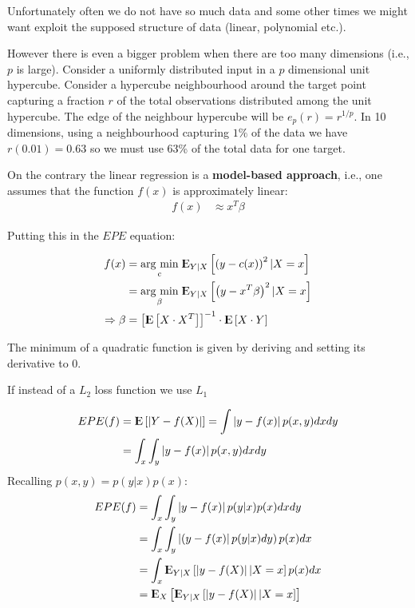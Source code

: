\documentclass[12pt, letterpaper]{article}
\theoremstyle{definition}
\newcommand{\E}{{\rm I\kern-.3em E}}
\newcommand{\argmin}[1]{\underset{#1}{\operatorname{arg}\,\operatorname{min}}\;}
\begin{document}
Unfortunately often we do not have so much data and some other times we might want exploit the supposed structure of data (linear, polynomial etc.).

However there is even a bigger problem when there are too many dimensions (i.e., $p$ is large). Consider a uniformly distributed input in a $p$ dimensional unit hypercube. Consider a hypercube neighbourhood around the target point capturing a fraction $r$ of the total observations distributed among the unit hypercube. The edge of the neighbour hypercube will be $e_p(r) = r^{1/p}$. In 10 dimensions, using a neighbourhood capturing $1\%$ of the data we have $r(0.01) = 0.63$ so we must use 63\% of the total data for one target.

On the contrary the linear regression is a \textbf{model-based approach}, i.e., one assumes that the function $f(x)$ is approximately linear:
\begin{align}
f(x) &\approx x^T \beta
\end{align}

Putting this in the $EPE$ equation:

\begin{equation}
\begin{aligned}
f(x) &= \argmin{c} \E_{Y|X} \left[ \left( y - c(x) \right)^2 | X=x \right]  \\
&= \argmin{\beta} \E_{Y|X} \left[ \left( y - x^T \beta \right)^2 | X=x \right] \\
\Rightarrow \beta &= \left[ \E\left[ X\cdot X ^T\right]\right]^{-1} \cdot \E\left[ X\cdot Y \right]
\end{aligned}
\end{equation}

The minimum of a quadratic function is given by deriving and setting its derivative to $0$.

If instead of a $L_2$ loss function we use $L_1$

\begin{equation}
\begin{aligned}
EPE(f) &= \E\left[ \left| Y- f(X) \right| \right] = \int \left| y- f(x) \right| p(x,y) dx dy \\
&= \int_x\int_y \left| y- f(x) \right|p(x,y) dx dy \\
\end{aligned}
\end{equation}
Recalling $p(x,y) = p( y|x) p(x)$:
\begin{equation}
\begin{aligned}
EPE(f) &= \int_x\int_y \left| y- f(x) \right|p(y|x)  p(x) dx dy \\
 &= \int_x \int_y \left| \left( y - f(x) \right| p(y|x) dy\right)  p(x) dx   \\
 &= \int_x \E_{Y|X} \left[ \left| y - f(X) \right| | X=x \right]  p(x) dx   \\
 &= \E_X \left[ \E_{Y|X} \left[ \left| y - f(X) \right| | X=x \right]    \right]   
\end{aligned}
\end{equation}
\end{document}
